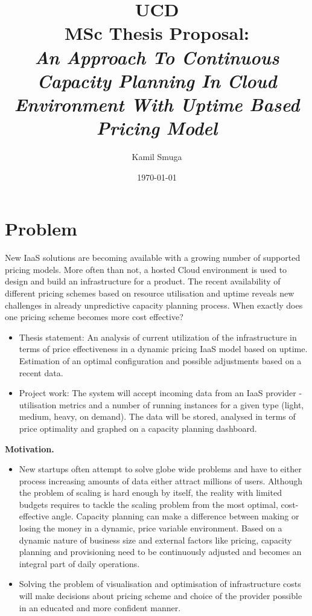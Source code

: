 \documentclass[11pt]{artikel3}
\title{UCD\\MSc Thesis Proposal:\\\emph{An Approach To Continuous Capacity Planning In Cloud Environment With Uptime Based Pricing Model}}
\author{Kamil Smuga}
\date{\today}
\begin{document}
\maketitle


\section{Problem}


New IaaS solutions are becoming available with a growing number of supported pricing models. More often than not, a hosted Cloud environment is used to design and build an infrastructure for a product. The recent availability of different pricing schemes based on resource utilisation and uptime reveals new challenges in already unpredictive capacity planning process. 
When exactly does one pricing scheme becomes more cost effective?


\begin{itemize}
\item Thesis statement: An analysis of current utilization of the infrastructure in terms of price effectiveness in a dynamic pricing IaaS model based on uptime. Estimation of an optimal configuration and possible adjustments based on a recent data.
\item Project work: The system will accept incoming data from an IaaS provider - utilisation metrics and a number of running instances for a given type (light, medium, heavy, on demand). The data will be stored, analysed in terms of price optimality and graphed on a capacity planning dashboard.  
\end{itemize}


{\bf Motivation.}
\begin{itemize}
\item New startups often attempt to solve globe wide problems and have to either process increasing amounts of data either attract millions of users. Although the problem of scaling is hard enough by itself, the reality with limited budgets requires to tackle the scaling problem from the most optimal, cost-effective angle. Capacity planning can make a difference between making or losing the money in a dynamic, price variable environment. Based on a dynamic nature of business size and external factors like pricing, capacity planning and provisioning need to be continuously adjusted and becomes an integral part of daily operations.
\item Solving the problem of visualisation and optimisation of infrastructure costs will make decisions about pricing scheme and choice of the provider possible in an educated and more confident manner.

\end{itemize}
\end{document}
